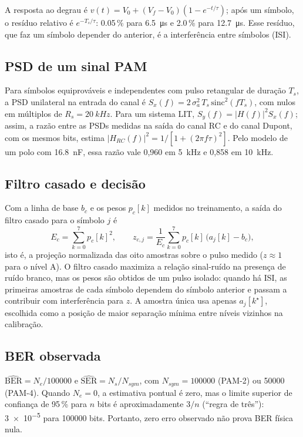\documentclass[12pt,a4paper]{article}
\begin{document}
A resposta ao degrau é $v(t) = V_0 + (V_f - V_0)\left(1 - e^{-t/\tau}\right)$; após um símbolo, o
resíduo relativo é $e^{-T_s/\tau}$: \num{0.05}\,\% para \SI{6,5}{\micro\second} e
\num{2.0}\,\% para \SI{12,7}{\micro\second}. Esse resíduo, que faz um símbolo depender do anterior,
é a interferência entre símbolos (ISI).

\subsection{PSD de um sinal PAM}
\label{sec:teopsd}

Para símbolos equiprováveis e independentes com pulso retangular de duração $T_s$, a PSD unilateral
na entrada do canal é $S_x(f) = 2\,\sigma_a^2\,T_s\,\mathrm{sinc}^2(fT_s)$, com nulos em múltiplos
de $R_s = \SI{20}{kHz}$. Para um sistema LIT, $S_y(f) = |H(f)|^2 S_x(f)$; assim, a razão entre as
PSDs medidas na saída do canal RC e do canal Dupont, com os mesmos bits, estima
$|H_{RC}(f)|^2 = 1/[1+(2\pi f\tau)^2]$. Pelo modelo de um polo com \SI{16,8}{nF}, essa razão vale
0,960 em \SI{5}{kHz} e 0,858 em \SI{10}{kHz}.

\subsection{Filtro casado e decisão}

Com a linha de base $b_c$ e os pesos $p_c[k]$ medidos no treinamento, a saída do filtro casado para o
símbolo $j$ é
\begin{equation}
    E_c = \sum_{k=0}^{7} p_c[k]^2, \qquad
    z_{c,j} = \frac{1}{E_c}\sum_{k=0}^{7} p_c[k]\,\bigl(a_j[k]-b_c\bigr),
    \label{eq:filtro}
\end{equation}
isto é, a projeção normalizada das oito amostras sobre o pulso medido ($z\approx 1$ para o nível A).
O filtro casado maximiza a relação sinal-ruído na presença de ruído branco, mas os pesos são obtidos
de um pulso isolado: quando há ISI, as primeiras amostras de cada símbolo dependem do símbolo anterior
e passam a contribuir com interferência para $z$. A amostra única usa apenas $a_j[k^\star]$, escolhida
como a posição de maior separação mínima entre níveis vizinhos na calibração.

\subsection{BER observada}

$\widehat{\text{BER}} = N_e/\num{100000}$ e $\widehat{\text{SER}} = N_s/N_{sym}$, com
$N_{sym} = \num{100000}$ (PAM-2) ou \num{50000} (PAM-4). Quando $N_e=0$, a estimativa pontual é zero,
mas o limite superior de confiança de 95\,\% para $n$ bits é aproximadamente $3/n$ (``regra de três''):
\num{3e-5} para \num{100000} bits. Portanto, zero erro observado não prova BER física nula.
\end{document}

